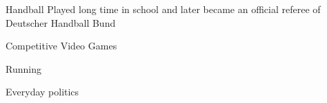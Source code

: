 



\begin{cvhonors}

  \cvhonor
    {Handball} %
    {Played long time in school and later became an official referee of Deutscher Handball Bund} %
    {} %
    {} %

  \cvhonor
    {Competitive Video Games} %
    {} %
    {} %
    {} %

  \cvhonor
  {Running} %
  {} %
  {} %
  {} %

\end{cvhonors}




\begin{cvhonors}

  \cvhonor
    {Everyday politics} %
    {} %
    {} %
    {} %

\end{cvhonors}
